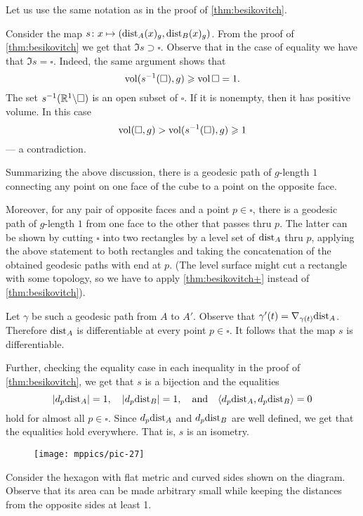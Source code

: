 Let us use the same notation as in the proof of \ref{thm:besikovitch}.

Consider the map $s\colon x\mapsto(\mathrm{dist}_A(x)_g,\mathrm{dist}_B(x)_g)$.
From the proof of \ref{thm:besikovitch} we get that $\Im s\supset \square$.
Observe that in the case of equality we have that $\Im s= \square$.
Indeed,
the same argument shows that 
\[\operatorname{\rm vol}\nolimits(s^{-1}(\square),g)\geqslant \operatorname{\rm vol}\nolimits\square=1.\]
The set $s^{-1}(\mathbb{R}^1\backslash \square)$ is an open subset of $\square$.
If it is nonempty, then it has positive volume.
In this case
\[\operatorname{\rm vol}\nolimits(\square,g)>\operatorname{\rm vol}\nolimits(s^{-1}(\square),g)\geqslant 1\]
--- a contradiction.

Summarizing the above discussion, there is a geodesic path of $g$-length $1$ connecting any point on one face of the cube to a point on the opposite face.

Moreover, for any pair of opposite faces and a point $p\in\square$, there is a geodesic path of $g$-length $1$ from one face to the other that passes thru $p$.
The latter can be shown by cutting $\square$ into two rectangles by a level set of $\mathrm{dist}_A$ thru $p$,
applying the above statement to both rectangles and taking the concatenation of the obtained geodesic paths with end at $p$.
(The level surface might cut a rectangle with some topology, so we have to apply \ref{thm:besikovitch+} instead of \ref{thm:besikovitch}).

Let $\gamma$ be such a geodesic path from $A$ to $A'$.
Observe that $\gamma'(t)\z=\nabla_{\gamma(t)}\distfun_A$.
Therefore $\mathrm{dist}_A$ is differentiable at every point $p\in \square$.
It follows that the map $s$ is differentiable.

Further, checking the equality case in each inequality in the proof of \ref{thm:besikovitch}, we get that $s$ is a bijection and the equalities
\[|d_{p}\mathrm{dist}_A|= 1,\quad|d_{p}\mathrm{dist}_B|=1,\quad \text{and}\quad \langle d_{p}\mathrm{dist}_A,d_{p}\mathrm{dist}_B\rangle= 0\]
hold for almost all $p\in\square$.
Since $d_{p}\mathrm{dist}_A$ and $d_{p}\mathrm{dist}_B$ are well defined, we get that the equalities hold everywhere.
That is, $s$ is an isometry.

\begin{wrapfigure}{r}{45 mm}
\vskip-4mm
\centering
\texttt{[image: mppics/pic-27]}
\end{wrapfigure}

Consider the hexagon with flat metric and curved sides shown on the diagram.
Observe that its area can be made arbitrary small while keeping the distances from the opposite sides at least 1.

